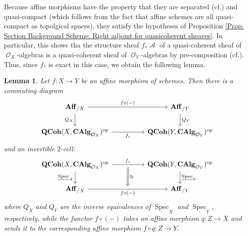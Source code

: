 \documentclass{amsart}
\newtheorem{lemma}[equation]{Lemma}
\theoremstyle{definition}
\DeclareMathOperator{\Ascr}{\mathscr{A}}
\DeclareMathOperator{\Ocal}{\mathcal{O}}
\DeclareMathOperator{\op}{op}
\DeclareMathOperator{\Spec}{Spec}
\newcommand{\CAlg}[1]{\mathbf{CAlg}_{#1}}
\newcommand{\RelSpec}[1]{\underline{\Spec}_{#1}}
\DeclareMathOperator{\QCoh}{\mathbf{QCoh}}
\numberwithin{equation}{subsection}
\begin{document}
Because affine morphisms have the property that they are separated (cf.\@ \cite[Proposition 1.2.4]{EGA2}) and quasi-compact (which follows from the fact that affine schemes are all quasi-compact as topolgical spaces), they satisfy the hypotheses of Proposition \ref{Prop: Section Background Scheme: Right adjoint for quasicoherent sheaves}. In particular, this shows tha the structure sheaf $f_{\ast}\Ascr$ of a quasi-coherent sheaf of $\Ocal_X$-algebras is a quasi-coherent sheaf of $\Ocal_Y$-algebras by pre-composition (cf.\@ \cite[Proposition 1.2.4]{EGA2}). Thus, since $f_{\ast}$ is exact in this case, we obtain the following lemma.
\begin{lemma}\label{Lemma: Section Background Scheme: Forward functoriality of relspec for affine maps}
Let $f:X \to Y$ be an affine morphism of schemes. Then there is a commuting diagram
\[
\begin{tikzcd}
\mathbf{Aff}_{/X} \ar[rr]{}{f \circ (-)} \ar[d, swap]{}{Q_X} & & \mathbf{Aff}_{/Y} \ar[d]{}{Q_Y} \\
\QCoh(X,\CAlg{\Ocal_X})^{\op} \ar[rr, swap]{}{f_{\ast}} & & \QCoh(Y,\CAlg{\Ocal_Y})^{\op}
\end{tikzcd}
\]
and an invertible $2$-cell:
\[
\begin{tikzcd}
	\QCoh(X,\CAlg{\Ocal_X})^{\op} \ar[d, swap]{}{\RelSpec{X}} \ar[rr, ""{name = U}]{}{f_{\ast}} & & \QCoh(Y,\CAlg{\Ocal_Y})^{\op}	\ar[d]{}{\RelSpec{Y}} \\
	\mathbf{Aff}_{/X} \ar[rr, swap, ""{name = D}]{}{f \circ (-)}  & & \mathbf{Aff}_{/Y} 
	\ar[from = U, to = D, Rightarrow, shorten <= 4pt, shorten >= 4pt]{}{\cong}
\end{tikzcd}
\]
where $Q_X$ and $Q_Y$ are the inverse equivalences of $\RelSpec{X}$ and $\RelSpec{Y}$, respectively, while the functor $f \circ (-)$ takes an affine morphism $q:Z \to X$ and sends it to the corresponding affine morphism $f \circ q:Z \to Y$.
\end{lemma} 
\end{document}
